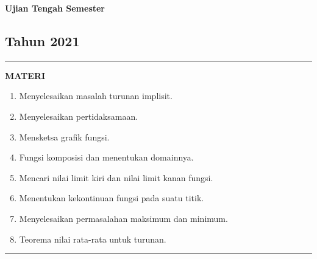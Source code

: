 \begin{flushright}
    \textbf{\Large{Ujian Tengah Semester}}
    \subsection*{Tahun 2021}
\end{flushright}


\vspace{0.5cm}\hrule height 2pt\vspace{0.5cm}


\begin{center}
\textbf{\large{MATERI}}
\begin{enumerate}[leftmargin=*, label={\arabic*}.]
\item Menyelesaikan masalah turunan implisit.
\item Menyelesaikan pertidaksamaan.
\item Mensketsa grafik fungsi.
\item Fungsi komposisi dan menentukan domainnya.
\item Mencari nilai limit kiri dan nilai limit kanan fungsi.
\item Menentukan kekontinuan fungsi pada suatu titik.
\item Menyelesaikan permasalahan maksimum dan minimum.
\item Teorema nilai rata-rata untuk turunan.
\end{enumerate}
\end{center}


\vspace{0.2cm}\hrule height 1pt\vspace{0.5cm}


